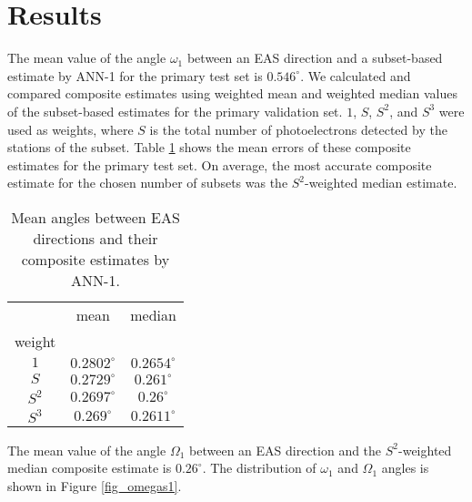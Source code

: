 \documentclass[reprint,
superscriptaddress,
amsmath,amssymb,aps,showkeys,showpacs,
twoside,final,secnumarabic,%
nofootinbib]{revtex4-2}
\begin{document}
\section{Results}\label{results}

The mean value of the angle $\omega_1$ between an EAS direction and a subset-based estimate by ANN-1 for the primary test set is $0.546^\circ$. 
We calculated and compared composite estimates using weighted mean and weighted median values of the subset-based estimates for the primary validation set. 
$1$, $S$, $S^2$, and $S^3$ were used as weights, where $S$ is the total number of photoelectrons detected by the stations of the subset. Table \ref{table1} shows the mean errors of these composite estimates for the primary test set. 
On average, the most accurate composite estimate for the chosen number of subsets was the $S^2$-weighted median estimate.

\begin{table}[h]
\renewcommand{\arraystretch}{1.25}
\renewcommand{\tabcolsep}{3pt}
\begin{center}\caption{Mean angles between EAS directions and their composite estimates by ANN-1.}
\begin{tabular}{|c|c|c|}\hline
             &      mean      &     median     \\
weight       &                &                \\ \hline
$1$          & $0.2802^\circ$ & $0.2654^\circ$ \\ \hline
$S$          & $0.2729^\circ$ & $0.261^\circ$  \\ \hline
$S^2$        & $0.2697^\circ$ & $0.26^\circ$   \\ \hline
$S^3$        & $0.269^\circ$  & $0.2611^\circ$ \\ \hline
\end{tabular}\label{table1}
\end{center}
\end{table}

The mean value of the angle $\Omega_1$ between an EAS direction and the $S^2$-weighted median composite estimate is $0.26^\circ$. The distribution of $\omega_1$ and $\Omega_1$ angles is shown in Figure \ref{fig_omegas1}.
\end{document}
